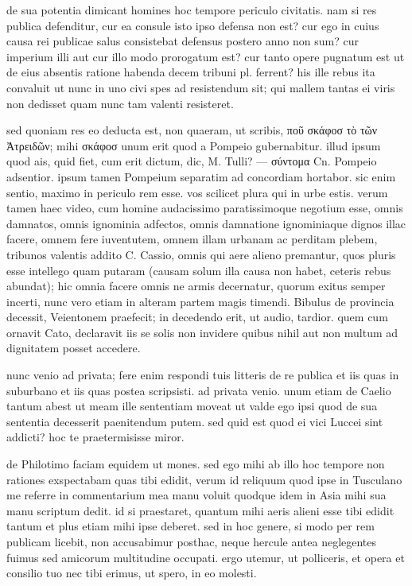  de sua potentia dimicant homines hoc tempore periculo civitatis. nam si res publica defenditur, cur ea consule isto ipso defensa non est? cur ego in cuius causa rei publicae salus consistebat defensus postero anno non sum? cur imperium illi aut cur illo modo prorogatum est? cur tanto opere pugnatum est ut de eius absentis ratione habenda decem tribuni pl. ferrent? his ille rebus ita convaluit ut nunc in uno civi spes ad resistendum sit; qui mallem tantas ei viris non dedisset quam nunc tam valenti resisteret.

 sed quoniam res eo deducta est, non quaeram, ut scribis, ποῦ σκάφοσ τὸ τῶν Ἀτρειδῶν; mihi σκάφοσ unum erit quod a Pompeio gubernabitur. illud ipsum quod ais, quid fiet, cum erit dictum, dic, M. Tulli? — σύντομα Cn. Pompeio adsentior. ipsum tamen Pompeium separatim ad concordiam hortabor. sic enim sentio, maximo in periculo rem esse. vos scilicet plura qui in urbe estis. verum tamen haec video, cum homine audacissimo paratissimoque negotium esse, omnis damnatos, omnis ignominia adfectos, omnis damnatione ignominiaque dignos illac facere, omnem fere iuventutem, omnem illam urbanam ac perditam plebem, tribunos valentis addito C. Cassio, omnis qui aere alieno premantur, quos pluris esse intellego quam putaram (causam solum illa causa non habet, ceteris rebus abundat); hic omnia facere omnis ne armis decernatur, quorum exitus semper incerti, nunc vero etiam in alteram partem magis timendi. Bibulus de provincia decessit, Veientonem praefecit; in decedendo erit, ut audio, tardior. quem cum ornavit Cato, declaravit iis se solis non invidere quibus nihil aut non multum ad dignitatem posset accedere.

 nunc venio ad privata; fere enim respondi tuis litteris de re publica et iis quas in suburbano et iis quas postea scripsisti. ad privata venio. unum etiam de Caelio tantum abest ut meam ille sententiam moveat ut valde ego ipsi quod de sua sententia decesserit paenitendum putem. sed quid est quod ei vici Luccei sint addicti? hoc te praetermisisse miror.

 de Philotimo faciam equidem ut mones. sed ego mihi ab illo hoc tempore non rationes exspectabam quas tibi edidit, verum id reliquum quod ipse in Tusculano me referre in commentarium mea manu voluit quodque idem in Asia mihi sua manu scriptum dedit. id si praestaret, quantum mihi aeris alieni esse tibi edidit tantum et plus etiam mihi ipse deberet. sed in hoc genere, si modo per rem publicam licebit, non accusabimur posthac, neque hercule antea neglegentes fuimus sed amicorum multitudine occupati. ergo utemur, ut polliceris, et opera et consilio tuo nec tibi erimus, ut spero, in eo molesti.

